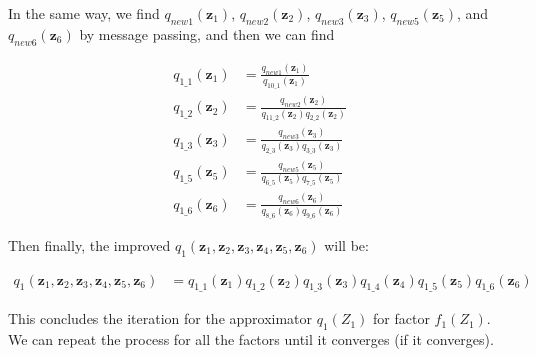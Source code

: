 \documentclass[a4]{article}
\begin{document}
In the same way, we find $q_{new1}(\bm{z}_1)$, $q_{new2}(\bm{z}_2)$,
$q_{new3}(\bm{z}_3)$, $q_{new5}(\bm{z}_5)$, and $q_{new6}(\bm{z}_6)$ by message passing, and then we can find

\begin{equation}
\begin{aligned}
q_{1\_1}(\bm{z}_1) &= \frac{q_{new1}(\bm{z}_1)}{q_{10\_1}(\bm{z}_1)}\\
q_{1\_2}(\bm{z}_2) &= \frac{q_{new2}(\bm{z}_2)}{q_{11\_2}(\bm{z}_2)q_{2\_2}(\bm{z}_2)}\\
q_{1\_3}(\bm{z}_3) &= \frac{q_{new3}(\bm{z}_3)}{q_{2\_3}(\bm{z}_3)q_{3\_3}(\bm{z}_3)}\\
q_{1\_5}(\bm{z}_5) &= \frac{q_{new5}(\bm{z}_5)}{q_{6\_5}(\bm{z}_5)q_{7\_5}(\bm{z}_5)}\\
q_{1\_6}(\bm{z}_6) &= \frac{q_{new6}(\bm{z}_6)}{q_{8\_6}(\bm{z}_6)q_{9\_6}(\bm{z}_6)}
\end{aligned}
\end{equation}

Then finally, the improved $q_1(\bm{z}_1, \bm{z}_2, \bm{z}_3, \bm{z}_4, \bm{z}_5, \bm{z}_6)$ will be:

\begin{equation}
\begin{aligned}
q_1(\bm{z}_1, \bm{z}_2, \bm{z}_3, \bm{z}_4, \bm{z}_5, \bm{z}_6) &=
q_{1\_1}(\bm{z}_1)q_{1\_2}(\bm{z}_2)q_{1\_3}(\bm{z}_3)q_{1\_4}(\bm{z}_4)q_{1\_5}(\bm{z}_5)q_{1\_6}(\bm{z}_6)
\end{aligned}
\end{equation}

This concludes the iteration for the approximator $q_1(Z_1)$ for factor $f_1(Z_1)$.
We can repeat the process for all the factors until it converges (if it converges).

{}

\end{document}
